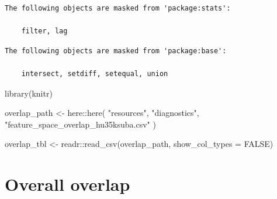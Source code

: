 \documentclass[
  letterpaper,
  DIV=11,
  numbers=noendperiod,
  openany,
  oneside]{scrreprt}
\newenvironment{Shaded}{\begin{snugshade}}{\end{snugshade}}
\newcommand{\AttributeTok}[1]{\textcolor[rgb]{0.40,0.45,0.13}{#1}}
\newcommand{\ConstantTok}[1]{\textcolor[rgb]{0.56,0.35,0.01}{#1}}
\newcommand{\FunctionTok}[1]{\textcolor[rgb]{0.28,0.35,0.67}{#1}}
\newcommand{\NormalTok}[1]{\textcolor[rgb]{0.00,0.23,0.31}{#1}}
\newcommand{\OtherTok}[1]{\textcolor[rgb]{0.00,0.23,0.31}{#1}}
\newcommand{\SpecialCharTok}[1]{\textcolor[rgb]{0.37,0.37,0.37}{#1}}
\newcommand{\StringTok}[1]{\textcolor[rgb]{0.13,0.47,0.30}{#1}}
\begin{document}
\begin{verbatim}
The following objects are masked from 'package:stats':

    filter, lag
\end{verbatim}

\begin{verbatim}
The following objects are masked from 'package:base':

    intersect, setdiff, setequal, union
\end{verbatim}

\begin{Shaded}
\begin{Highlighting}[]
\FunctionTok{library}\NormalTok{(knitr)}

\NormalTok{overlap\_path }\OtherTok{\textless{}{-}}\NormalTok{ here}\SpecialCharTok{::}\FunctionTok{here}\NormalTok{(}
  \StringTok{"resources"}\NormalTok{,}
  \StringTok{"diagnostics"}\NormalTok{,}
  \StringTok{"feature\_space\_overlap\_hu35ksuba.csv"}
\NormalTok{)}

\NormalTok{overlap\_tbl }\OtherTok{\textless{}{-}}\NormalTok{ readr}\SpecialCharTok{::}\FunctionTok{read\_csv}\NormalTok{(overlap\_path, }\AttributeTok{show\_col\_types =} \ConstantTok{FALSE}\NormalTok{)}
\end{Highlighting}
\end{Shaded}

\section{Overall overlap}\label{overall-overlap}
\end{document}
